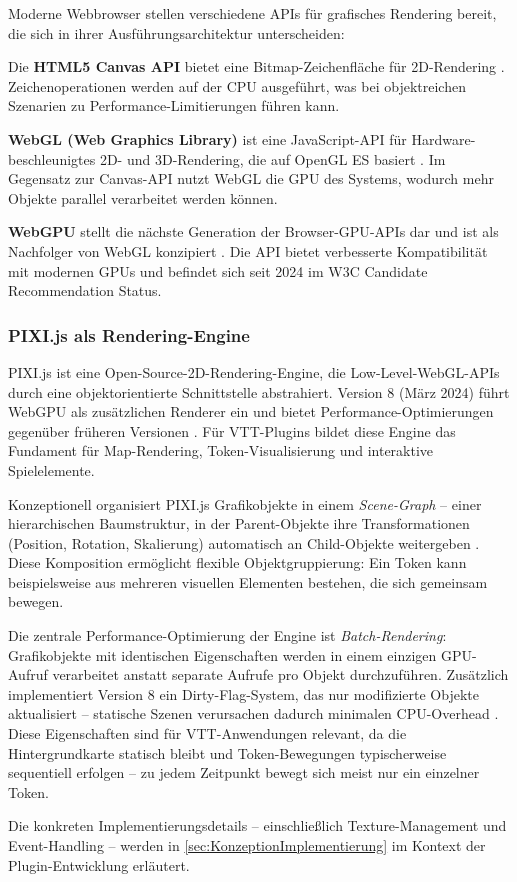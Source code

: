 Moderne Webbrowser stellen verschiedene APIs für grafisches Rendering bereit, die sich in ihrer Ausführungsarchitektur unterscheiden:

Die \textbf{HTML5 Canvas API} bietet eine Bitmap-Zeichenfläche für 2D-Rendering \autocite{WikiCanvas2024}. Zeichenoperationen werden auf der \ac{CPU} ausgeführt, was bei objektreichen Szenarien zu Performance-Limitierungen führen kann.

\textbf{WebGL (Web Graphics Library)} ist eine JavaScript-\ac{API} für Hardware-beschleunigtes 2D- und 3D-Rendering, die auf OpenGL ES basiert \autocite{WikiWebGL2024}. Im Gegensatz zur Canvas-\ac{API} nutzt WebGL die \ac{GPU} des Systems, wodurch mehr Objekte parallel verarbeitet werden können.

\textbf{WebGPU} stellt die nächste Generation der Browser-\ac{GPU}-\ac{API}s dar und ist als Nachfolger von WebGL konzipiert \autocite{WikiWebGPU2024}. Die \ac{API} bietet verbesserte Kompatibilität mit modernen \ac{GPU}s und befindet sich seit 2024 im W3C Candidate Recommendation Status.

\subsubsection{PIXI.js als Rendering-Engine}
\label{subsubsec:PIXIjsArchitektur}

PIXI.js ist eine Open-Source-2D-Rendering-Engine, die Low-Level-\ac{WebGL}-APIs durch eine objektorientierte Schnittstelle abstrahiert. Version 8 (März 2024) führt WebGPU als zusätzlichen Renderer ein und bietet Performance-Optimierungen gegenüber früheren Versionen \autocite{PixiJS2024Launch}. Für \ac{VTT}-Plugins bildet diese Engine das Fundament für Map-Rendering, Token-Visualisierung und interaktive Spielelemente.

Konzeptionell organisiert PIXI.js Grafikobjekte in einem \textit{Scene-Graph} -- einer hierarchischen Baumstruktur, in der Parent-Objekte ihre Transformationen (Position, Rotation, Skalierung) automatisch an Child-Objekte weitergeben \autocite{PixiJSSceneGraph2024}. Diese Komposition ermöglicht flexible Objektgruppierung: Ein Token kann beispielsweise aus mehreren visuellen Elementen bestehen, die sich gemeinsam bewegen.

Die zentrale Performance-Optimierung der Engine ist \textit{Batch-Rendering}: Grafikobjekte mit identischen Eigenschaften werden in einem einzigen GPU-Aufruf verarbeitet anstatt separate Aufrufe pro Objekt durchzuführen. Zusätzlich implementiert Version 8 ein Dirty-Flag-System, das nur modifizierte Objekte aktualisiert -- statische Szenen verursachen dadurch minimalen CPU-Overhead \autocite{PixiJSV8Performance2024}. Diese Eigenschaften sind für \ac{VTT}-Anwendungen relevant, da die Hintergrundkarte statisch bleibt und Token-Bewegungen typischerweise sequentiell erfolgen -- zu jedem Zeitpunkt bewegt sich meist nur ein einzelner Token.

Die konkreten Implementierungsdetails -- einschließlich Texture-Management und Event-Handling -- werden in \autoref{sec:KonzeptionImplementierung} im Kontext der Plugin-Entwicklung erläutert.
